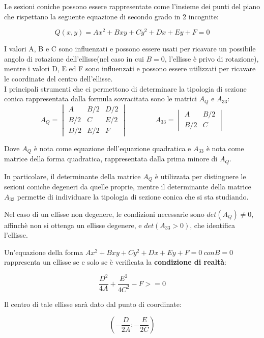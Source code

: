 \documentclass[10pt, a4paper]{article}
\theoremstyle{remark}
\begin{document}
	Le sezioni coniche possono essere rappresentate come l'insieme dei punti del piano che rispettano la seguente equazione di secondo grado in 2 incognite:
	
	\begin{equation}
		Q(x,y) = Ax^2 + Bxy + Cy^2 + Dx + Ey + F =0
	\end{equation}

	I valori A, B e C sono influenzati e possono essere usati per ricavare un possibile angolo di rotazione dell'ellisse(nel caso in cui $B=0$, l'ellisse è privo di rotazione), mentre i valori D, E ed F sono influenzati e possono essere utilizzati per ricavare le coordinate del centro dell'ellisse.\\

	I principali strumenti che ci permettono di determinare la tipologia di sezione conica rappresentata dalla formula sovracitata sono le matrici $A_Q$ e $A_{33}$:
	$$A_Q = \begin{vmatrix}
		A & B/2 & D/2 \\
		B/2 & C & E/2 \\
		D/2 & E/2 & F
	\end{vmatrix}
	\qquad
	\qquad
	A_{33}= \begin{vmatrix}
		A & B/2 \\
		B/2 & C
	\end{vmatrix}$$

	Dove $A_Q$ è nota come equazione dell'equazione quadratica e $A_{33}$ è nota come matrice della forma quadratica, rappresentata dalla prima minore di $A_Q$.	
	
	In particolare, il determinante della matrice $A_Q$ è utilizzata per distinguere le sezioni coniche degeneri da quelle proprie, mentre il determinante della matrice $A_{33}$ permette di individuare la tipologia di sezione conica che si sta studiando. 
	
	Nel caso di un ellisse non degenere, le condizioni necessarie sono $det(A_Q) \ne 0$, affinchè non si ottenga un ellisse degenere, e $det(A_{33} > 0)$, che identifica l'ellisse.
	
	\begin{theorem*}
		Un'equazione della forma $Ax^2 + Bxy + Cy^2 + Dx + Ey + F =0 \: con B=0$ rappresenta un ellisse se e solo se è verificata la \textbf{condizione di realtà}:
		
		$$ \frac{D^2}{4A} + \frac{E^2}{4C^2} - F >= 0 $$
		
		Il centro di tale ellisse sarà dato dal punto di coordinate:
		
		$$ \left( -\frac{D}{2A}; -\frac{E}{2C} \right) $$ 
		
	\end{theorem*}
\end{document}
